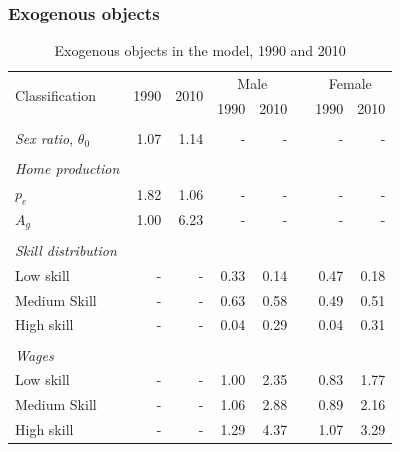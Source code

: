 \documentclass{beamer}
\begin{document}
\begin{frame}
	\frametitle{Exogenous objects}
	\tiny
	\begin{table}[]
		\centering
		\caption{Exogenous objects in the model, 1990 and 2010}
		\begin{tabular}{lrrrrrrr}
			\toprule
			\multirow{2}[4]{*}{Classification} & \multicolumn{1}{c}{\multirow{2}[4]{*}{1990}} & \multicolumn{1}{c}{\multirow{2}[4]{*}{2010}} & \multicolumn{2}{c}{Male} &       & \multicolumn{2}{c}{Female} \\
			\cmidrule{4-5}\cmidrule{7-8}      &       &       & 1990  & 2010  &       & 1990  & 2010 \\
			\midrule
			&       &       &       &       &       &       &  \\
			\textit{Sex ratio}, $\theta_0$ & 1.07  & 1.14  & -     & -     &       & -     & - \\
			&       &       &       &       &       &       &  \\
			\textit{Home production} &       &       &       &       &       &       &  \\
			$p_e$ & 1.82  & 1.06  & -     & -     &       & -     & - \\
			\textit{$A_g$} & 1.00  & 6.23  & -     & -     &       & -     & - \\
			&       &       &       &       &       &       &  \\
			\textit{Skill distribution} &       &       &       &       &       &       &  \\
			Low skill & -     & -     & 0.33  & 0.14  &       & 0.47  & 0.18 \\
			Medium Skill & -     & -     & 0.63  & 0.58  &       & 0.49  & 0.51 \\
			High skill & -     & -     & 0.04  & 0.29  &       & 0.04  & 0.31 \\
			&       &       &       &       &       &       &  \\
			\textit{Wages} &       &       &       &       &       &       &  \\
			Low skill & -     & -     & 1.00  & 2.35  &       & 0.83  & 1.77 \\
			Medium Skill & -     & -     & 1.06  & 2.88  &       & 0.89  & 2.16 \\
			High skill & -     & -     & 1.29  & 4.37  &       & 1.07  & 3.29 \\
			\bottomrule
			\bottomrule
		\end{tabular}
	\end{table}
\end{frame}
\end{document}

